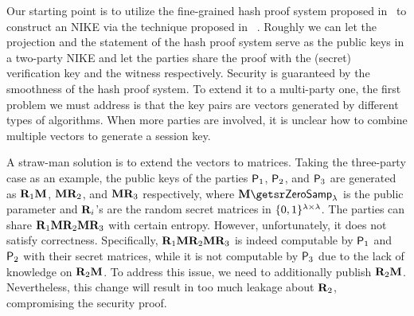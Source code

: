 Our starting point is to utilize the fine-grained hash proof system proposed in~\cite{JC:EgaWanTan21} to construct an NIKE via the technique proposed in ~\cite{C:HesHofKoh18}. Roughly we can let the projection and the statement of the hash proof system serve as the public keys in a two-party NIKE and let the parties share the proof with the (secret) verification key and the witness respectively.
Security is guaranteed by the smoothness of the hash proof system.
To extend it to a multi-party one, the first problem we must address is that the key pairs are vectors generated by different types of algorithms. 
When more parties are involved, it is unclear how to combine multiple vectors to generate a session key.

A straw-man solution is to extend the vectors to matrices.
Taking the three-party case as an example, the public keys of the parties $\mathsf{P}_1$, $\mathsf{P}_2$, and $\mathsf{P}_3$ are generated as $\mathbf{{R}}_1\mathbf{{M}}$, $\mathbf{{M}}\mathbf{{R}}_2$, and $\mathbf{{M}}\mathbf{{R}}_3$ respectively, where $\matr M\getsr\zs$ is the public parameter and $\mathbf{{R}}_i$'s are the random secret matrices in $\{0, 1\}^{\lambda\times\lambda}$. The parties can share $\mathbf{{R}}_1\mathbf{{M}}\mathbf{{R}}_2\mathbf{{M}}\mathbf{{R}}_3$ with certain entropy. However, unfortunately, it does not satisfy correctness. Specifically, $\mathbf{{R}}_1\mathbf{{M}}\mathbf{{R}}_2\mathbf{{M}}\mathbf{{R}}_3$ is indeed computable by $\mathsf{P}_1$ and $\mathsf{P}_2$ with their secret matrices, while it is not computable by $\mathsf{P}_3$ due to the lack of knowledge on $\mathbf{{R}}_2\mathbf{{M}}$.
To address this issue, we need to additionally publish $\mathbf{{R}}_2\mathbf{{M}}$. Nevertheless, this change will result in too much leakage about $\mathbf{{R}}_2$, compromising the security proof.

